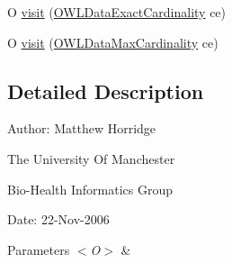 \begin{DoxyCompactItemize}
\item 
O \hyperlink{classorg_1_1semanticweb_1_1owlapi_1_1util_1_1_o_w_l_class_expression_visitor_ex_adapter_3_01_o_01_4_a5c256a82ed74a84daea36132ba08226d}{visit} (\hyperlink{interfaceorg_1_1semanticweb_1_1owlapi_1_1model_1_1_o_w_l_data_exact_cardinality}{O\-W\-L\-Data\-Exact\-Cardinality} ce)
\item 
O \hyperlink{classorg_1_1semanticweb_1_1owlapi_1_1util_1_1_o_w_l_class_expression_visitor_ex_adapter_3_01_o_01_4_a33e3c293244acf380d330be694769eab}{visit} (\hyperlink{interfaceorg_1_1semanticweb_1_1owlapi_1_1model_1_1_o_w_l_data_max_cardinality}{O\-W\-L\-Data\-Max\-Cardinality} ce)
\end{DoxyCompactItemize}


\subsection{Detailed Description}
Author\-: Matthew Horridge\par
 The University Of Manchester\par
 Bio-\/\-Health Informatics Group\par
 Date\-: 22-\/\-Nov-\/2006\par
 \par



\begin{DoxyParams}{Parameters}
{\em $<$\-O$>$} & \\
\hline
\end{DoxyParams}


